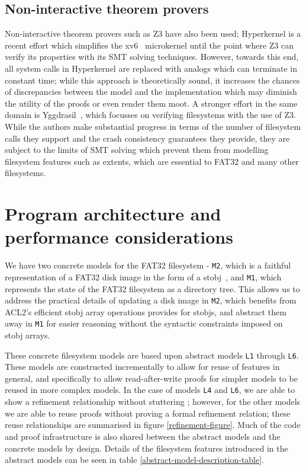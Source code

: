 \documentclass[submission,copyright,creativecommons]{eptcs}
\begin{document}
\subsection{Non-interactive theorem provers}
Non-interactive theorem provers such as Z3 \cite{de2008z3}
have also been used; Hyperkernel
\cite{Nelson:2017:HPV:3132747.3132748} is a recent effort which
simplifies the xv6~\cite{cox6xv6} microkernel until the
point where Z3 can verify its properties with its SMT solving
techniques. However, towards this end, all system calls in Hyperkernel
are replaced with analogs which can terminate in constant time; while
this approach is theoretically sound, it increases the chances of
discrepancies between the model and
the implementation which may diminish the utility of the proofs or
even render them moot. A stronger effort in the same domain is
Yggdrasil~\cite{sigurbjarnarson2016push}, which focusses on verifying
filesystems with the use of Z3. While the authors make substantial
progress in terms of the number of filesystem calls they support and
the crash consistency guarantees they provide, they are subject to
the limits of SMT solving which prevent them from modelling filesystem
features such as extents, which are essential to FAT32 and many other
filesystems.

\section{Program architecture and performance considerations}

We have two concrete models for the FAT32 filesystem - \texttt{M2},
which is a faithful representation of a FAT32 disk image in the form
of a stobj~\cite{boyer2002single}, and \texttt{M1}, which represents the
state of the FAT32 filesystem as a directory tree. This allows us to
address the practical details of updating a disk image in \texttt{M2},
which benefits from ACL2's efficient stobj array operations provides
for stobjs, and abstract them away in \texttt{M1} for easier reasoning
without the syntactic constraints imposed on stobj arrays.

These concrete filesystem models are based upon abstract models
\texttt{L1} through \texttt{L6}. These models are constructed
incrementally to allow for reuse of features in general, and
specifically to allow read-after-write proofs for simpler models to be
reused in more complex models. In the case of models \texttt{L4} and
\texttt{L6}, we are able to show a refinement relationship
without stuttering \cite{abadi1991existence}; however, for the other
models we are able to reuse proofs without proving a formal refinement
relation; these reuse relationships are summarised in figure
\ref{refinement-figure}. Much of the code and proof infrastructure is
also shared between the abstract models and the concrete models by
design. Details of the filesystem features introduced in the abstract
models can be seen in table \ref{abstract-model-description-table}.
\end{document}
